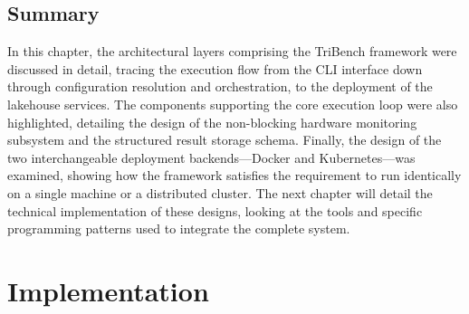 \documentclass{l4proj}
\begin{document}



\section{Summary}
\label{sec:design_summary}

In this chapter, the architectural layers comprising the TriBench framework were discussed in detail, tracing the execution flow from the CLI interface down through configuration resolution and orchestration, to the deployment of the lakehouse services. The components supporting the core execution loop were also highlighted, detailing the design of the non-blocking hardware monitoring subsystem and the structured result storage schema. Finally, the design of the two interchangeable deployment backends---Docker and Kubernetes---was examined, showing how the framework satisfies the requirement to run identically on a single machine or a distributed cluster. The next chapter will detail the technical implementation of these designs, looking at the tools and specific programming patterns used to integrate the complete system.





\chapter{Implementation}
\label{chap:impl}
\end{document}
